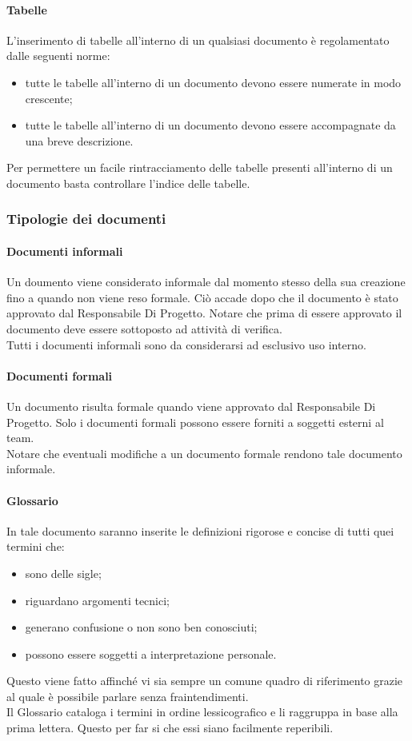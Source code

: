 			\paragraph{Tabelle}
				L’inserimento di tabelle all’interno di un qualsiasi documento è regolamentato dalle seguenti norme:
				\begin{itemize}
					\item tutte le tabelle all’interno di un documento devono essere numerate in modo crescente;
					\item tutte le tabelle all’interno di un documento devono essere accompagnate da una breve descrizione.
				\end{itemize}
				Per permettere un facile rintracciamento delle tabelle presenti all’interno di un documento basta controllare l’indice delle tabelle.
		\subsubsection{Tipologie dei documenti}
			\paragraph{Documenti informali}
				Un doumento viene considerato informale dal momento stesso della sua creazione fino a quando non viene reso formale. Ciò accade dopo che il documento è stato approvato dal Responsabile Di Progetto. Notare che prima di essere approvato il documento deve essere sottoposto ad attività di verifica.\\
				Tutti i documenti informali sono da considerarsi ad esclusivo uso interno.
			\paragraph{Documenti formali}
				Un documento risulta formale quando viene approvato dal Responsabile Di Progetto. Solo i documenti formali possono essere forniti a soggetti esterni al team.\\
				Notare che eventuali modifiche a un documento formale rendono tale documento informale.
			\paragraph{Glossario}
				In tale documento saranno inserite le definizioni rigorose e concise di tutti quei termini che:
				\begin{itemize}
					\item sono delle sigle;
					\item riguardano argomenti tecnici;
					\item generano confusione o non sono ben conosciuti;
					\item possono essere soggetti a interpretazione personale.
				\end{itemize}
				Questo viene fatto affinché vi sia sempre un comune quadro di riferimento grazie al quale è possibile parlare senza fraintendimenti.\\
				Il Glossario cataloga i termini in ordine lessicografico e li raggruppa in base alla prima lettera. Questo per far si che essi siano facilmente reperibili.

